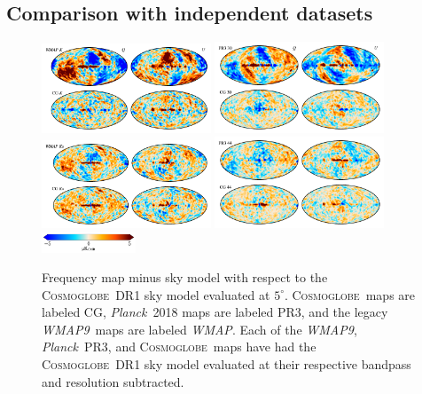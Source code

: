 \documentclass[twocolumn]{../../common/aa}
\def\WMAP{\emph{WMAP}}
\def\WMAPnine{\emph{WMAP9}}
\def\Planck{\emph{Planck}}
\newcommand{\cosmoglobe}{\textsc{Cosmoglobe}}
\begin{document}
\subsection{Comparison with independent datasets}
\label{sec:comp_independent}

\begin{figure}
	\begin{center}
	\includegraphics[width=0.45\textwidth]{figures/CG_DR1_residuals_topleft.pdf}
	\includegraphics[width=0.45\textwidth]{figures/CG_DR1_residuals_topright.pdf}
	\includegraphics[width=0.45\textwidth]{figures/CG_DR1_residuals_bottomleft.pdf}
	\includegraphics[width=0.45\textwidth]{figures/CG_DR1_residuals_bottomright.pdf}
        \includegraphics[width=0.25\textwidth]{figures/cbar_5uK.pdf}
	\end{center}
	\caption{Frequency map minus sky model with respect to the \cosmoglobe\ DR1 sky model evaluated at $5^\circ$. \cosmoglobe\ maps are labeled CG, \Planck\ 2018 maps are labeled PR3, and the legacy \WMAPnine\ maps are labeled \WMAP. Each of the \WMAPnine, \Planck\ PR3, and \cosmoglobe\ maps have had the \cosmoglobe\ DR1 sky model evaluated at their respective bandpass and resolution subtracted. 
	}
	\label{fig:cg_residuals}
\end{figure}
\end{document}
